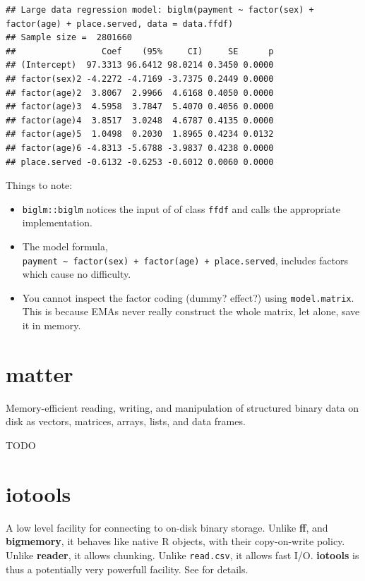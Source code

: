\documentclass[]{book}
\providecommand{\tightlist}{%
  \setlength{\itemsep}{0pt}\setlength{\parskip}{0pt}}
\theoremstyle{definition}
\theoremstyle{definition}
\theoremstyle{definition}
\theoremstyle{remark}
\begin{document}
\begin{verbatim}
## Large data regression model: biglm(payment ~ factor(sex) + factor(age) + place.served, data = data.ffdf)
## Sample size =  2801660 
##                 Coef    (95%     CI)     SE      p
## (Intercept)  97.3313 96.6412 98.0214 0.3450 0.0000
## factor(sex)2 -4.2272 -4.7169 -3.7375 0.2449 0.0000
## factor(age)2  3.8067  2.9966  4.6168 0.4050 0.0000
## factor(age)3  4.5958  3.7847  5.4070 0.4056 0.0000
## factor(age)4  3.8517  3.0248  4.6787 0.4135 0.0000
## factor(age)5  1.0498  0.2030  1.8965 0.4234 0.0132
## factor(age)6 -4.8313 -5.6788 -3.9837 0.4238 0.0000
## place.served -0.6132 -0.6253 -0.6012 0.0060 0.0000
\end{verbatim}

Things to note:

\begin{itemize}
\tightlist
\item
  \texttt{biglm::biglm} notices the input of of class \texttt{ffdf} and
  calls the appropriate implementation.
\item
  The model formula,
  \texttt{payment\ \textasciitilde{}\ factor(sex)\ +\ factor(age)\ +\ place.served},
  includes factors which cause no difficulty.
\item
  You cannot inspect the factor coding (dummy? effect?) using
  \texttt{model.matrix}. This is because EMAs never really construct the
  whole matrix, let alone, save it in memory.
\end{itemize}

\section{matter}\label{matter}

Memory-efficient reading, writing, and manipulation of structured binary
data on disk as vectors, matrices, arrays, lists, and data frames.

TODO

\section{iotools}\label{iotools}

A low level facility for connecting to on-disk binary storage. Unlike
\textbf{ff}, and \textbf{bigmemory}, it behaves like native R objects,
with their copy-on-write policy. Unlike \textbf{reader}, it allows
chunking. Unlike \texttt{read.csv}, it allows fast I/O. \textbf{iotools}
is thus a potentially very powerfull facility. See
\citet{arnold2015iotools} for details.
\end{document}
